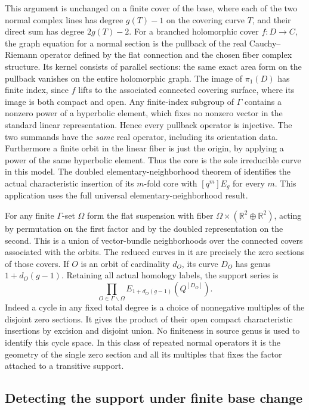 This argument is unchanged on a finite cover of the base, where each of the two normal complex lines has degree $g(T)-1$ on the covering curve $T$, and their direct sum has degree $2g(T)-2$. For a branched holomorphic cover \(f:D\to C\), the graph equation for a normal section is the pullback of the real Cauchy--Riemann operator defined by the flat connection and the chosen fiber complex structure. Its kernel consists of parallel sections: the same exact area form on the pullback vanishes on the entire holomorphic graph. The image of \(\pi_1(D)\) has finite index, since \(f\) lifts to the associated connected covering surface, where its image is both compact and open. Any finite-index subgroup of \(\Gamma\) contains a nonzero power of a hyperbolic element, which fixes no nonzero vector in the standard linear representation. Hence every pullback operator is injective. The two summands have the \emph{same} real operator, including its orientation data. Furthermore a finite orbit in the linear fiber is just the origin, by applying a power of the same hyperbolic element. Thus the core is the sole irreducible curve in this model. The doubled elementary-neighborhood theorem of \cite{WueProduct} identifies the actual characteristic insertion of its \(m\)-fold core with \([q^m]E_g\) for every \(m\). This application uses the full universal elementary-neighborhood result.

For any finite \(\Gamma\)-set \(\Omega\) form the flat suspension with fiber \(\Omega\times(\mathbb R^2\oplus\mathbb R^2)\), acting by permutation on the first factor and by the doubled representation on the second. This is a union of vector-bundle neighborhoods over the connected covers associated with the orbits. The reduced curves in it are precisely the zero sections of those covers. If \(O\) is an orbit of cardinality \(d_O\), its curve \(D_O\) has genus \(1+d_O(g-1)\). Retaining all actual homology labels, the support series is
\[\prod_{O\in\Gamma\backslash\Omega}
                  E_{1+d_O(g-1)}(Q^{[D_O]}).\]
Indeed a cycle in any fixed total degree is a choice of nonnegative multiples of the disjoint zero sections. It gives the product of their open compact characteristic insertions by excision and disjoint union. No finiteness in source genus is used to identify this cycle space. In this class of repeated normal operators it is the geometry of the single zero section and all its multiples that fixes the factor attached to a transitive support.

\subsection{Detecting the support under finite base change}

